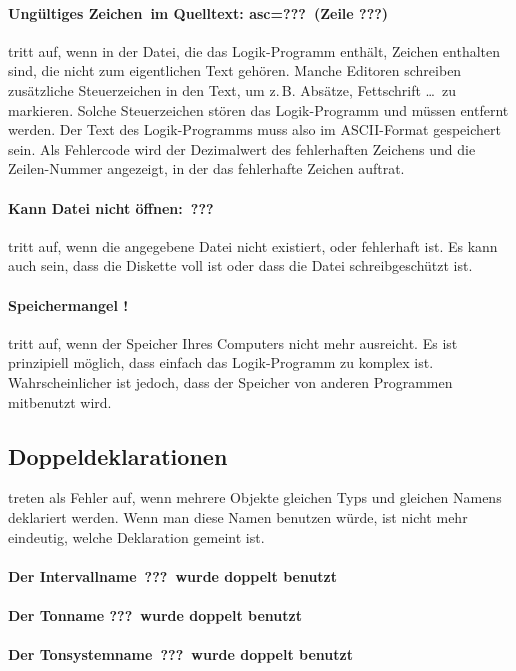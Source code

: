 \paragraph{Ungültiges Zeichen\ im Quelltext: asc=???\ (Zeile ???)}
tritt auf, wenn in der Datei, die das Logik-Programm enthält,
Zeichen enthalten sind, die nicht zum eigentlichen Text gehören.
Manche Editoren schreiben zusätzliche Steuerzeichen in den Text,
um z.\,B. Absätze, Fettschrift \ldots\ zu markieren. Solche
Steuerzeichen stören das Logik-Programm und müssen entfernt
 werden. Der Text des Logik-Programms muss also im ASCII-Format
gespeichert sein. Als Fehlercode wird der
Dezimalwert des fehlerhaften Zeichens und die Zeilen-Nummer
angezeigt, in der das fehlerhafte Zeichen auftrat.

\paragraph{Kann Datei nicht öffnen:\ ???} tritt auf, wenn die
angegebene Datei nicht existiert, oder fehlerhaft ist.
Es kann auch
sein, dass die Diskette voll ist oder dass die Datei
schreibgeschützt ist.

\paragraph{Speichermangel !} tritt auf, wenn der Speicher Ihres
Computers nicht mehr ausreicht. Es ist prinzipiell möglich,
dass einfach das Logik-Programm zu komplex ist.
Wahrscheinlicher ist jedoch, dass der Speicher von anderen
Programmen mitbenutzt wird.

\subsection{Doppeldeklarationen}\label{sec:doppeldeklarationen}
treten als Fehler auf, wenn mehrere Objekte gleichen Typs und gleichen
Namens deklariert werden. Wenn man diese Namen benutzen würde, ist
nicht mehr eindeutig, welche Deklaration gemeint ist.
\paragraph{Der Intervallname\ ???\ wurde doppelt benutzt}
\paragraph{Der Tonname ???\ wurde doppelt benutzt}
\paragraph{Der Tonsystemname\ ???\ wurde doppelt benutzt}
